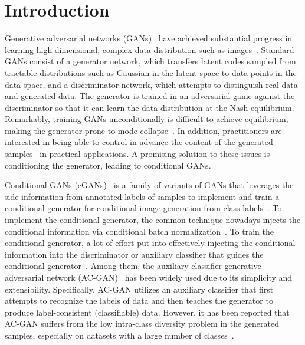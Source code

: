 \documentclass[nohyperref]{article}
\theoremstyle{plain}
\theoremstyle{definition}
\theoremstyle{remark}
\begin{document}
\section{Introduction}

Generative adversarial networks (GANs)~\cite{NIPS2014_5ca3e9b1} have achieved substantial progress in learning high-dimensional, complex data distribution such as images~\cite{brock2018large,Karras_2019_CVPR,Karras_2020_CVPR,NEURIPS2020_8d30aa96,karras2021aliasfree}.
Standard GANs consist of a generator network, which transfers latent codes sampled from tractable distributions such as Gaussian in the latent space to data points in the data space, and a discriminator network, which attempts to distinguish real data and generated data.
The generator is trained in an adversarial game against the discriminator so that it can learn the data distribution at the Nash equilibrium.
Remarkably, training GANs unconditionally is difficult to achieve equilibrium, making the generator prone to mode collapse~\cite{NIPS2016_8a3363ab,NEURIPS2018_288cc0ff,Chen_2019_CVPR}.
In addition, practitioners are interested in being able to control in advance the content of the generated samples~\cite{yan2015attribute2image,tan2020michigan} in practical applications.
A promising solution to these issues is conditioning the generator, leading to conditional GANs.

Conditional GANs (cGANs)~\cite{mirza2014conditional} is a family of variants of GANs that leverages the side information from annotated labels of samples to implement and train a conditional generator for conditional image generation from class-labels~\cite{pmlr-v70-odena17a,miyato2018cgans,brock2018large}.
To implement the conditional generator, the common technique nowadays injects the conditional information via conditional batch normalization~\cite{NIPS2017_6fab6e3a,hou2021slimmable}.
To train the conditional generator, a lot of effort put into effectively injecting the conditional information into the discriminator or auxiliary classifier that guides the conditional generator~\cite{odena2016semi,miyato2018cgans,zhou2018activation,Kavalerov_2021_WACV,NEURIPS2020_f490c742,zhou2020omni}.
Among them, the auxiliary classifier generative adversarial network (AC-GAN)~\cite{pmlr-v70-odena17a} has been widely used due to its simplicity and extensibility.
Specifically, AC-GAN utilizes an auxiliary classifier that first attempts to recognize the labels of data and then teaches the generator to produce label-consistent (classifiable) data.
However, it has been reported that AC-GAN suffers from the low intra-class diversity problem in the generated samples, especially on datasets with a large number of classes~\cite{pmlr-v70-odena17a,shu2017ac,NEURIPS2019_4ea06fbc}.
\end{document}
